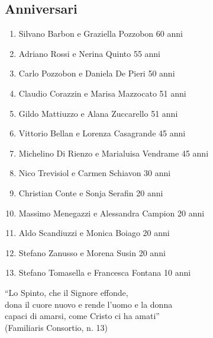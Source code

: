 \subsection{Anniversari}

\begin{enumerate}
  \item Silvano Barbon e Graziella Pozzobon \hfill 60 anni
  \item Adriano Rossi e Nerina Quinto \hfill 55 anni
  \item Carlo Pozzobon e Daniela De Pieri \hfill 50 anni
  \item Claudio Corazzin e Marisa Mazzocato \hfill 51 anni
  \item Gildo Mattiuzzo e Alana Zuccarello \hfill 51 anni
  \item Vittorio Bellan e Lorenza Casagrande \hfill 45 anni
  \item Michelino Di Rienzo e Marialuisa Vendrame \hfill 45 anni
  \item Nico Trevisiol e Carmen Schiavon \hfill 30 anni
  \item Christian Conte e Sonja Serafin \hfill 20 anni
  \item Massimo Menegazzi e Alessandra Campion \hfill 20 anni
  \item Aldo Scandiuzzi e Monica Boiago \hfill 20 anni
  \item Stefano Zanusso e Morena Susin \hfill 20 anni
  \item Stefano Tomasella e Francesca Fontana \hfill 10 anni
\end{enumerate}

\begin{center}
``Lo Spinto, che il Signore effonde,\\
dona il cuore nuovo e rende l'uomo e la donna\\
capaci di amarsi, come Cristo ci ha amati''\\
(Familiaris Consortio, n. 13)
\end{center}

